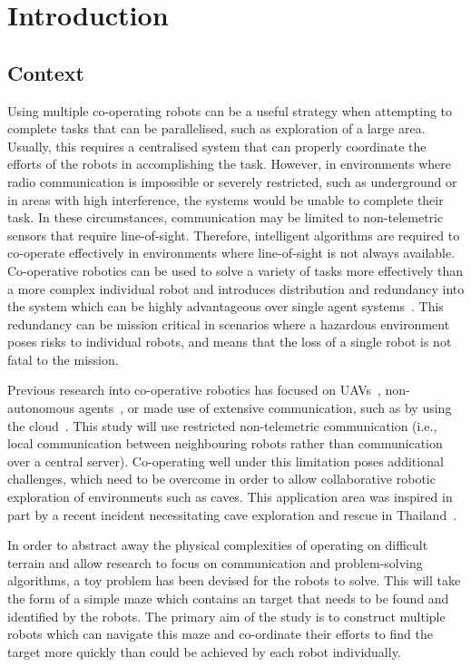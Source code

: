 
\chapter{Introduction}\label{introduction}
\section{Context}\label{introduction/context}
Using multiple co-operating robots can be a useful strategy when attempting
to complete tasks that can be parallelised, such as exploration of a large
area. Usually, this requires a centralised system that can properly coordinate
the efforts of the robots in accomplishing the task. However, in environments
where radio communication is impossible or severely restricted, such as underground
or in areas with high interference, the systems would be unable to complete
their task. In these circumstances, communication may be limited to
non-telemetric sensors that require line-of-sight. Therefore, intelligent
algorithms are required to co-operate effectively in environments where line-of-sight
is not always available.
Co-operative robotics can be used to solve a variety of tasks
more effectively than a more complex individual robot and introduces
distribution and redundancy into the system which can be
highly advantageous over single agent systems~\cite{dudek96}. This redundancy
can be mission critical in scenarios where a hazardous environment poses risks
to individual robots, and means that the loss of a single robot is not fatal to
the mission.

Previous research into co-operative robotics has focused on UAVs~\cite{khan18},
non-autonomous agents~\cite{jimenez18}, or made use of extensive communication,
such as by using the cloud~\cite{wensing2018cooperative}. This study will use
restricted non-telemetric communication (i.e., local communication between
neighbouring robots rather than communication over a central server). Co-operating
well under this limitation poses additional challenges, which need to be overcome
in order to allow collaborative robotic exploration of environments such as caves.
This application area was inspired in part by a recent incident necessitating cave
exploration and rescue in Thailand~\cite{bbcthailand}.

In order to abstract away the physical complexities of operating on difficult
terrain and allow research to focus on communication and problem-solving algorithms,
a toy problem has been devised for the robots to solve. This will take the form
of a simple maze which contains an target that needs to be found and identified
by the robots. The primary aim of the study is to construct multiple robots which can
navigate this maze and co-ordinate their efforts to find the target more quickly than
could be achieved by each robot individually.

